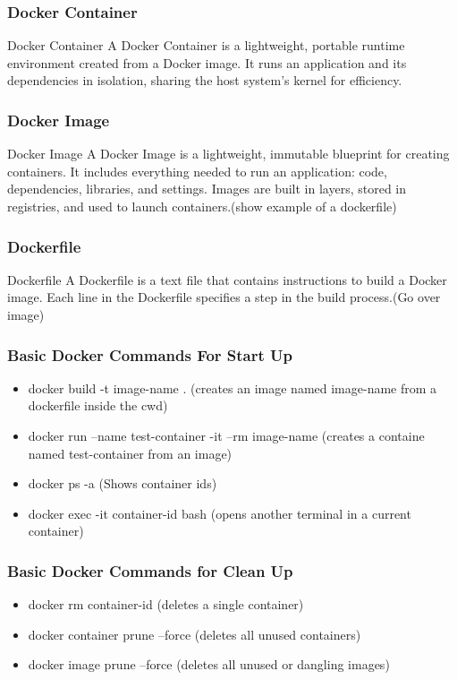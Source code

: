 \documentclass{beamer}
\begin{document}
\begin{frame}\frametitle{Docker Container}
\begin{block}{Docker Container}
A Docker Container is a lightweight, portable runtime environment created from 
a Docker image. It runs an application and its dependencies in isolation, 
sharing the host system's kernel for efficiency.
\end{block}
\end{frame}


\begin{frame}\frametitle{Docker Image}
\begin{block}{Docker Image}
A Docker Image is a lightweight, immutable blueprint for creating containers. 
It includes everything needed to run an application: code, dependencies, 
libraries, and settings. Images are built in layers, stored in registries,
and used to launch containers.(show example of a dockerfile)
\end{block}
\end{frame}


\begin{frame}\frametitle{Dockerfile}
\begin{block}{Dockerfile}
A Dockerfile is a text file that contains instructions to build a Docker image.
Each line in the Dockerfile specifies a step in the build process.(Go over image)
\end{block}
\end{frame}


\begin{frame}\frametitle{Basic Docker Commands For Start Up}
\begin{itemize}
\item docker build -t image-name . (creates an image named image-name from a dockerfile inside the cwd)
\item docker run --name test-container -it --rm image-name (creates a containe named test-container from an image)  
\item docker ps -a (Shows container ids)
\item docker exec -it container-id bash (opens another terminal in a current container)
\end{itemize}
\end{frame}
    

\begin{frame}\frametitle{Basic Docker Commands for Clean Up}
\begin{itemize}
\item docker rm container-id (deletes a single container)
\item docker container prune --force (deletes all unused containers)
\item docker image prune --force (deletes all unused or dangling images)
\end{itemize}
\end{frame}
\end{document}
